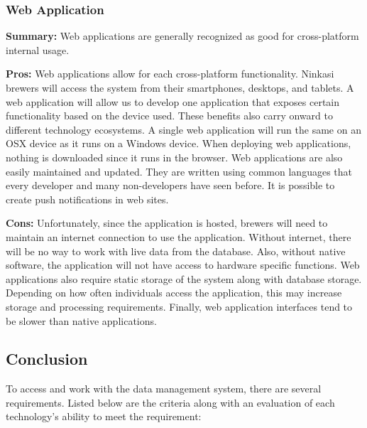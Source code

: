\documentclass[draftclsnofoot,onecolumn,letterpaper,10pt,compsoc]{IEEEtran}
\begin{document}
  			\subsubsection{Web Application}
		        \textbf{Summary:}
		            Web applications are generally recognized as good for cross-platform internal usage\cite{SearchCloudOverview}.

		        \noindent \textbf{Pros:}
		            Web applications allow for each cross-platform functionality.
		            Ninkasi brewers will access the system from their smartphones, desktops, and tablets.
		            A web application will allow us to develop one application that exposes certain functionality based on the device used.
		            These benefits also carry onward to different technology ecosystems.
		            A single web application will run the same on an OSX device as it runs on a Windows device.
		            When deploying web applications, nothing is downloaded since it runs in the browser.
		            Web applications are also easily maintained and updated.
		            They are written using common languages that every developer and many non-developers have seen before.
		            It is possible to create push notifications in web sites\cite{GooglePushNotifications}.

		        \noindent \textbf{Cons:}
		            Unfortunately, since the application is hosted, brewers will need to maintain an internet connection to use the application.
		            Without internet, there will be no way to work with live data from the database.
		            Also, without native software, the application will not have access to hardware specific functions.
		            Web applications also require static storage of the system along with database storage.
		            Depending on how often individuals access the application, this may increase storage and processing requirements.
		            Finally, web application interfaces tend to be slower than native applications\cite{LifeWireOverview}.

		    \subsection{Conclusion}
		    To access and work with the data management system, there are several requirements. Listed below are the criteria along with an evaluation of each technology's ability to meet the requirement:\\
\end{document}
